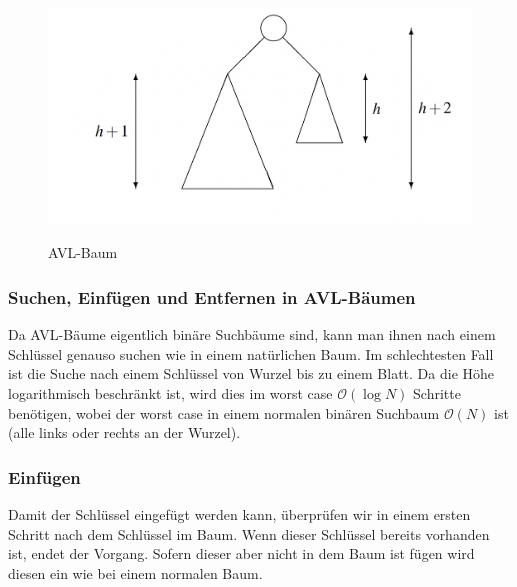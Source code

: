 \documentclass[a4paper]{article}
\begin{document}
\begin{figure}[t] 
\caption{AVL-Baum }
\centering
\includegraphics[scale= 0.5]{Pictures/AVL-trees-allg.png}
\label{fig: AVL-trees-allg}
\end{figure}

\newpage
\subsubsection{Suchen, Einfügen und Entfernen in AVL-Bäumen}
Da AVL-Bäume eigentlich binäre Suchbäume sind, kann man ihnen nach einem Schlüssel genauso suchen wie in einem natürlichen Baum. Im schlechtesten Fall ist die Suche nach einem Schlüssel von Wurzel bis zu einem Blatt. Da die Höhe logarithmisch beschränkt ist, wird dies im worst case $\mathcal{O} (\log N)$ Schritte benötigen, wobei der worst case in einem normalen binären Suchbaum $\mathcal{O} (N)$ ist (alle links oder rechts an der Wurzel). 

\subsubsection{Einfügen}\label{subsection EinfügenAVL}
Damit der Schlüssel eingefügt werden kann, überprüfen wir in einem ersten Schritt nach dem Schlüssel im Baum. Wenn dieser Schlüssel bereits vorhanden ist, endet der Vorgang. Sofern dieser aber nicht in dem Baum ist fügen wird diesen ein wie bei einem normalen Baum.
\end{document}
